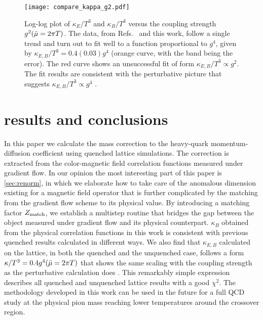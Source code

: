 \documentclass[floatfix,twocolumn,prd,showpacs,preprintnumbers,amsmath,nofootinbib,amssymb,superscriptaddress]{revtex4-2}
\def\ccites#1{Refs.~\cite{#1}} %
\begin{document}
\begin{figure}[t]
\centerline{
    \texttt{[image: compare\_kappa\_g2.pdf]}
    }
    \caption{
    Log-log plot of $\kappa_E/T^3$ and $\kappa_B/T^3$ versus the coupling strength $g^2(\bar{\mu}=2\pi T)$. The data, from
    \ccites{Francis:2015daa,Altenkort:2020fgs,Banerjee:2022gen,Brambilla:2022xbd,Brambilla:2020siz,Banerjee:2022uge} and this work,
    follow a single trend and turn out to fit well to a function proportional to $g^4$, given by $\kappa_{E,B}/T^3 = 0.4(0.03) g^4$ (orange curve, with the band being the error). The red curve shows an unsuccessful fit of form $ \kappa_{E,B}/T^3 \propto g^2$.
    The fit results are consistent with the perturbative picture that suggests $\kappa_{E,B}/T^3 \propto g^4$ \cite{Caron-Huot:2007rwy}.}
    \label{fig:kappa-g2}
\end{figure}



\section{results and conclusions}
\label{sec:results}

In this paper we calculate the mass correction to the heavy-quark momentum-diffusion coefficient using quenched lattice simulations.
The correction is extracted from the color-magnetic field correlation functions measured under gradient flow.
In our opinion the most interesting part of this paper is \cref{sec:renorm}, in which we elaborate how to take care of the anomalous dimension existing for a magnetic field operator that is further complicated by the matching from the gradient flow scheme to its physical value.
By introducing a matching factor $Z_{\mathrm{match}}$, we establish a multistep routine that bridges the gap between the object measured under gradient flow and its physical counterpart.
$\kappa_B$ obtained from the physical correlation functions in this work is consistent with previous quenched results calculated in different ways.
We also find that $\kappa_{E,B}$ calculated on the lattice, in both the quenched and the unquenched case, follows a form $\kappa/T^3 = 0.4g^4(\bar{\mu}=2\pi T)$ that shows the same scaling with the coupling strength as the perturbative calculation does \cite{Caron-Huot:2007rwy}.
This remarkably simple expression describes all quenched and unquenched lattice results with a good $\chi^2$.
The methodology developed in this work can be used in the future for a full QCD study at the physical pion mass reaching lower temperatures around the crossover region.
\end{document}
